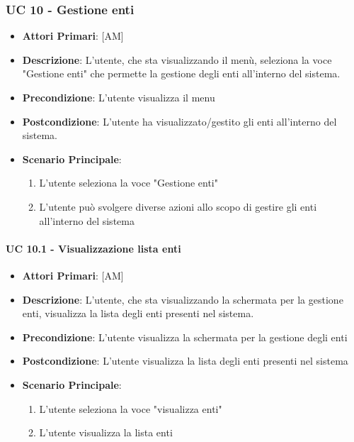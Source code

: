 \subsubsection{UC 10 - Gestione enti}
		\begin{itemize}
			\item \textbf{Attori Primari}: [AM]
			\item \textbf{Descrizione}: L'utente, che sta visualizzando il menù, seleziona la voce "Gestione enti" che permette la gestione degli enti all'interno del sistema.
			\item \textbf{Precondizione}: L'utente visualizza il menu
			\item \textbf{Postcondizione}: L'utente ha visualizzato/gestito gli enti all'interno del sistema. 
			\item \textbf{Scenario Principale}:
			\begin{enumerate}
				\item{L'utente seleziona la voce "Gestione enti"}
				\item{L'utente può svolgere diverse azioni allo scopo di gestire gli enti all'interno del sistema}
			\end{enumerate}	
		\end{itemize}

			\paragraph{UC 10.1 - Visualizzazione lista enti }
			\begin{itemize}
				\item \textbf{Attori Primari}: [AM]
				\item \textbf{Descrizione}: L'utente, che sta visualizzando la schermata per la gestione enti, visualizza la lista degli enti presenti nel sistema.
				\item \textbf{Precondizione}: L'utente visualizza la schermata per la gestione degli enti
				\item \textbf{Postcondizione}: L'utente visualizza la lista degli enti presenti nel sistema
				\item \textbf{Scenario Principale}:
				\begin{enumerate}
					\item{L'utente seleziona la voce "visualizza enti"}
					\item{L'utente visualizza la lista enti}
				\end{enumerate}	
			\end{itemize}

